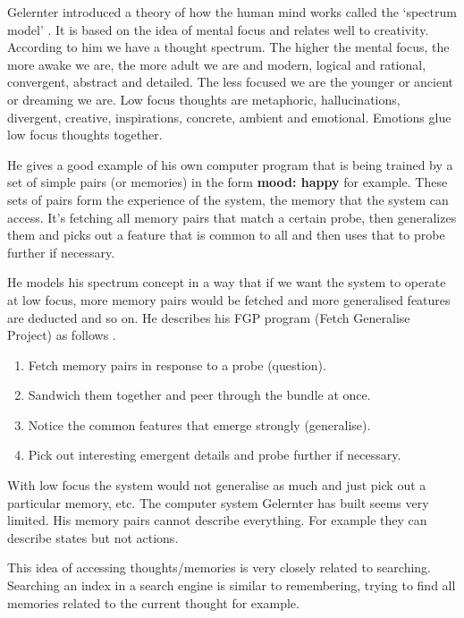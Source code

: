 \spirals

Gelernter introduced a theory of how the human mind works called the `spectrum model' \autocite*{Gelernter1994}. It is based on the idea of mental focus and relates well to creativity. According to him we have a thought spectrum. The higher the mental focus, the more awake we are, the more adult we are and modern, logical and rational, convergent, abstract and detailed. The less focused we are the younger or ancient or dreaming we are. Low focus thoughts are metaphoric, hallucinations, divergent, creative, inspirations, concrete, ambient and emotional. Emotions glue low focus thoughts together.

He gives a good example of his own computer program that is being trained by a set of simple pairs (or memories) in the form \textbf{mood: happy} for example. These sets of pairs form the experience of the system, the memory that the system can access. It's fetching all memory pairs that match a certain probe, then generalizes them and picks out a feature that is common to all and then uses that to probe further if necessary.

He models his spectrum concept in a way that if we want the system to operate at low focus, more memory pairs would be fetched and more generalised features are deducted and so on. He describes his FGP program (Fetch Generalise Project) as follows \autocite{Gelernter1994}.

\begin{enumerate}
  \item Fetch memory pairs in response to a probe (question).
  \item Sandwich them together and peer through the bundle at once.
  \item Notice the common features that emerge strongly (generalise).
  \item Pick out interesting emergent details and probe further if necessary.
\end{enumerate}

With low focus the system would not generalise as much and just pick out a particular memory, etc. The computer system Gelernter has built seems very limited. His memory pairs cannot describe everything. For example they can describe states but not actions.

This idea of accessing thoughts/memories is very closely related to searching. Searching an index in a search engine is similar to remembering, trying to find all memories related to the current thought for example.

